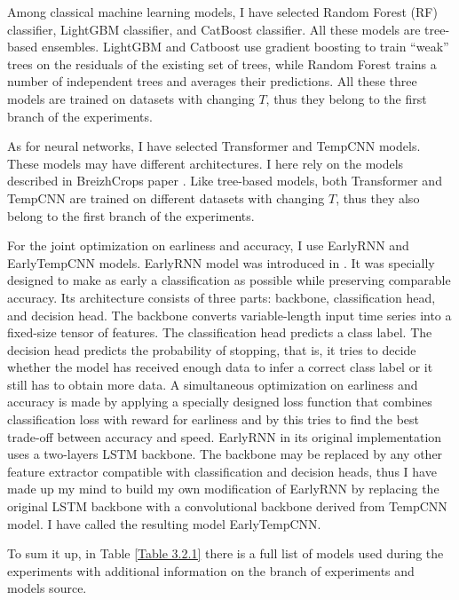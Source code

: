 \documentclass{article}
\begin{document}
Among classical machine learning models, I have selected Random Forest (RF) classifier, LightGBM classifier, and CatBoost classifier. All these models are tree-based ensembles. LightGBM and Catboost use gradient boosting to train “weak” trees on the residuals of the existing set of trees, while Random Forest trains a number of independent trees and averages their predictions. All these three models are trained on datasets with changing $T$, thus they belong to the first branch of the experiments.

As for neural networks, I have selected Transformer and TempCNN models. These models may have different architectures. I here rely on the models described in BreizhCrops paper \cite{breizhcrops2020}. Like tree-based models, both Transformer and TempCNN are trained on different datasets with changing $T$, thus they also belong to the first branch of the experiments.

For the joint optimization on earliness and accuracy, I use EarlyRNN and EarlyTempCNN models. EarlyRNN model was introduced in \cite{rußwurm2022endtoend}. It was specially designed to make as early a classification as possible while preserving comparable accuracy. Its architecture consists of three parts: backbone, classification head, and decision head. The backbone converts variable-length input time series into a fixed-size tensor of features. The classification head predicts a class label. The decision head predicts the probability of stopping, that is, it tries to decide whether the model has received enough data to infer a correct class label or it still has to obtain more data. A simultaneous optimization on earliness and accuracy is made by applying a specially designed loss function that combines classification loss with reward for earliness and by this tries to find the best trade-off between accuracy and speed. EarlyRNN in its original implementation uses a two-layers LSTM backbone. The backbone may be replaced by any other feature extractor compatible with classification and decision heads, thus I have made up my mind to build my own modification of EarlyRNN by replacing the original LSTM backbone with a convolutional backbone derived from TempCNN model. I have called the resulting model EarlyTempCNN.

To sum it up, in Table \ref{Table 3.2.1} there is a full list of models used during the experiments with additional information on the branch of experiments and models source.
\end{document}
